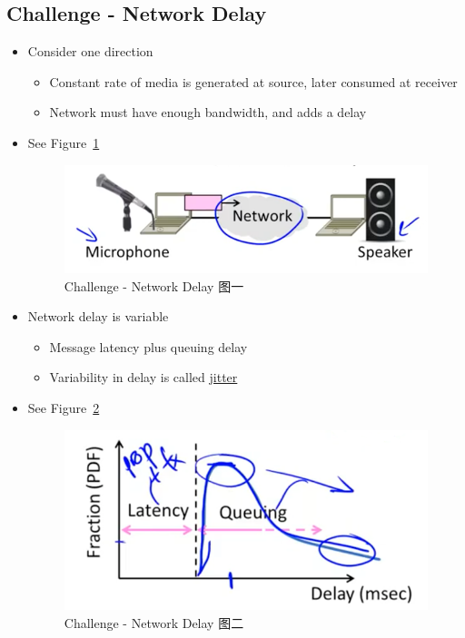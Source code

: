 \documentclass[12pt]{ctexart}   %
\begin{document}
	\subsection{Challenge - Network Delay}
	\begin{itemize}
		\item Consider one direction
		\begin{itemize}
			\item Constant rate of media is generated at source, later consumed at receiver
			\item Network must have enough bandwidth, and adds a delay
		\end{itemize}
		\item See Figure~\ref{fig:9-2-2}
		  
		 \begin{figure}[h!] %
		\centering
		 \includegraphics[scale=0.7]{images/9-2-2}
		\caption{ Challenge - Network Delay 图一}
		 \label{fig:9-2-2}
		 \end{figure}
		 
		 \item Network delay is variable
		 \begin{itemize}
		 	\item Message latency plus queuing delay
		 	\item Variability in delay is called \underline{jitter}
		 \end{itemize}
		 \item See Figure~\ref{fig:9-2-3}
		  
		 \begin{figure}[h!] %
		\centering
		 \includegraphics[scale=0.7]{images/9-2-3}
		\caption{ Challenge - Network Delay 图二}
		 \label{fig:9-2-3}
		 \end{figure}
	\end{itemize}
	
\end{document}
